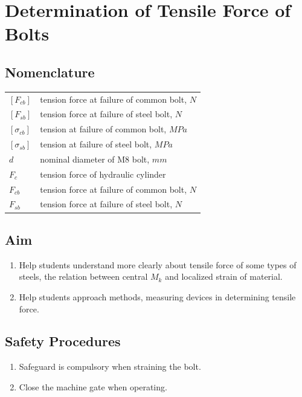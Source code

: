 \chapter{Determination of Tensile Force of Bolts}
\section{Nomenclature}
\begin{tabular}[t]{lp{8cm}}
		$ [F_{cb}] $ & tension force at failure of common bolt, $ N $\\
		$ [F_{sb}] $ & tension force at failure of steel bolt, $ N $\\
		$ [\sigma_{cb}] $ & tension at failure of common bolt, $ MPa $\\
		$ [\sigma_{sb}] $ & tension at failure of steel bolt, $ MPa $\\
		$ d $ & nominal diameter of M8 bolt, $ mm $\\
		$ F_c $ & tension force of hydraulic cylinder\\
		$ F_{cb} $ & tension force at failure of common bolt, $ N $\\
		$ F_{sb} $ & tension force at failure of steel bolt, $ N $\\
\end{tabular}

\section{Aim}
\begin{enumerate}
	\item Help students understand more clearly about tensile force of some types of steels, the relation between central $ M_k $ and localized strain of material.
	\item Help students approach methods, measuring devices in determining tensile force.
\end{enumerate}

\section{Safety Procedures}
\begin{enumerate}
	\item Safeguard is compulsory when straining the bolt.
	\item Close the machine gate when operating.
\end{enumerate}

